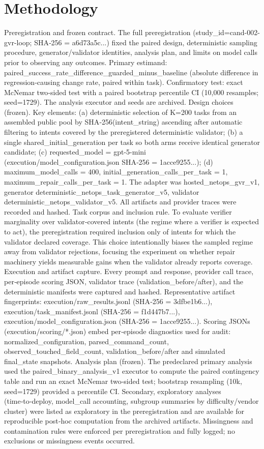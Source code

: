 \documentclass[conference]{IEEEtran}
\begin{document}
\section{Methodology}
Preregistration and frozen contract. The full preregistration (study\_id=cand-002-gvr-loop; SHA‑256 = a6d73a5c...) fixed the paired design, deterministic sampling procedure, generator/validator identities, analysis plan, and limits on model calls prior to observing any outcomes. Primary estimand: paired\_success\_rate\_difference\_guarded\_minus\_baseline (absolute difference in regression‑causing change rate, paired within task). Confirmatory test: exact McNemar two‑sided test with a paired bootstrap percentile CI (10,000 resamples; seed=1729). The analysis executor and seeds are archived.
Design choices (frozen). Key elements: (a) deterministic selection of K=200 tasks from an assembled public pool by SHA‑256(intent\_string) ascending after automatic filtering to intents covered by the preregistered deterministic validator; (b) a single shared\_initial\_generation per task so both arms receive identical generator candidate; (c) requested\_model = gpt-5-mini (execution/model\_configuration.json SHA‑256 = 1acce9255...); (d) maximum\_model\_calls = 400, initial\_generation\_calls\_per\_task = 1, maximum\_repair\_calls\_per\_task = 1. The adapter was hosted\_netops\_gvr\_v1, generator deterministic\_netops\_task\_generator\_v5, validator deterministic\_netops\_validator\_v5. All artifacts and provider traces were recorded and hashed.
Task corpus and inclusion rule. To evaluate verifier marginality over validator‑covered intents (the regime where a verifier is expected to act), the preregistration required inclusion only of intents for which the validator declared coverage. This choice intentionally biases the sampled regime away from validator rejections, focusing the experiment on whether repair machinery yields measurable gains when the validator already reports coverage.
Execution and artifact capture. Every prompt and response, provider call trace, per‑episode scoring JSON, validator trace (validation\_before/after), and the deterministic manifests were captured and hashed. Representative artifact fingerprints: execution/raw\_results.jsonl (SHA‑256 = 3dfbe1b6...), execution/task\_manifest.jsonl (SHA‑256 = f1d447b7...), execution/model\_configuration.json (SHA‑256 = 1acce9255...). Scoring JSONs (execution/scoring/*.json) embed per‑episode diagnostics used for audit: normalized\_configuration, parsed\_command\_count, observed\_touched\_field\_count, validation\_before/after and simulated final\_state snapshots.
Analysis plan (frozen). The predeclared primary analysis used the paired\_binary\_analysis\_v1 executor to compute the paired contingency table and run an exact McNemar two‑sided test; bootstrap resampling (10k, seed=1729) provided a percentile CI. Secondary, exploratory analyses (time‑to‑deploy, model\_call accounting, subgroup summaries by difficulty/vendor cluster) were listed as exploratory in the preregistration and are available for reproducible post‑hoc computation from the archived artifacts. Missingness and contamination rules were enforced per preregistration and fully logged; no exclusions or missingness events occurred.
\end{document}
